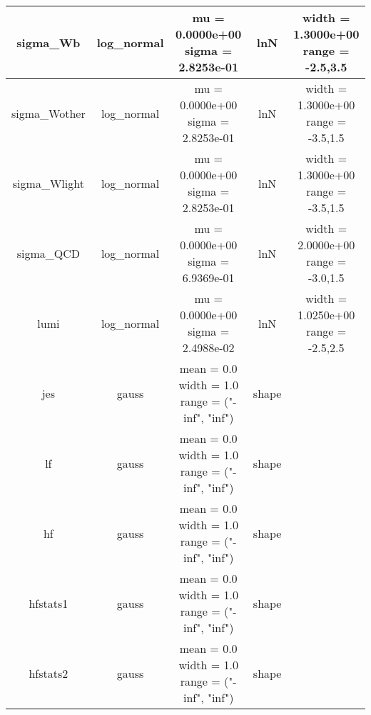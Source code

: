 \documentclass{article}
\begin{document}
\begin{center}
\begin{scriptsize}
\begin{tabular}{ | c | c | c | c | c |  }
      \hline
      sigma\_Wb & log\_normal & \shortstack{mu = 0.0000e+00 \\ sigma = 2.8253e-01} & lnN & \shortstack{width = 1.3000e+00 \\ range = -2.5,3.5} \\
      \hline
      sigma\_Wother & log\_normal & \shortstack{mu = 0.0000e+00 \\ sigma = 2.8253e-01} & lnN & \shortstack{width = 1.3000e+00 \\ range = -3.5,1.5} \\
      \hline
      sigma\_Wlight & log\_normal & \shortstack{mu = 0.0000e+00 \\ sigma = 2.8253e-01} & lnN & \shortstack{width = 1.3000e+00 \\ range = -3.5,1.5} \\
      \hline
      sigma\_QCD & log\_normal & \shortstack{mu = 0.0000e+00 \\ sigma = 6.9369e-01} & lnN & \shortstack{width = 2.0000e+00 \\ range = -3.0,1.5} \\
      \hline
      lumi & log\_normal & \shortstack{mu = 0.0000e+00 \\ sigma = 2.4988e-02} & lnN & \shortstack{width = 1.0250e+00 \\ range = -2.5,2.5} \\
      \hline
      jes & gauss & \shortstack{mean = 0.0 \\ width = 1.0 \\ range = ("-inf", "inf")} & shape & \shortstack{} \\
      \hline
      lf & gauss & \shortstack{mean = 0.0 \\ width = 1.0 \\ range = ("-inf", "inf")} & shape & \shortstack{} \\
      \hline
      hf & gauss & \shortstack{mean = 0.0 \\ width = 1.0 \\ range = ("-inf", "inf")} & shape & \shortstack{} \\
      \hline
      hfstats1 & gauss & \shortstack{mean = 0.0 \\ width = 1.0 \\ range = ("-inf", "inf")} & shape & \shortstack{} \\
      \hline
      hfstats2 & gauss & \shortstack{mean = 0.0 \\ width = 1.0 \\ range = ("-inf", "inf")} & shape & \shortstack{} \\

\end{tabular}
\end{scriptsize}
\end{center}
\end{document}
